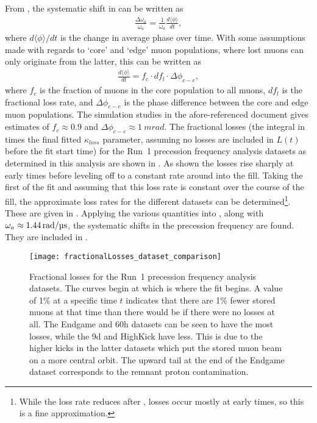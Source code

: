 From , the systematic shift in \wa can be written as
    \begin{align}
        \frac{\Delta\omega_{a}}{\omega_{a}} = \frac{1}{\omega_{a}}\frac{d\langle\phi\rangle}{dt},
    \end{align}
where $d\langle\phi\rangle/dt$ is the change in average phase over time. With some assumptions made with regards to `core' and `edge' muon populations, where lost muons can only originate from the latter, this can be written as~\cite{MikeLosses}
    \begin{align} \label{eq:phaseChangeLostMuons}
        \frac{d\langle\phi\rangle}{dt} = f_{c} \cdot df_{l} \cdot \Delta\phi_{c-e},
    \end{align}
where $f_{c}$ is the fraction of muons in the core population to all muons, $df_{l}$ is the fractional loss rate, and $\Delta\phi_{c-e}$ is the phase difference between the core and edge muon populations. The simulation studies in the afore-referenced document gives estimates of $f_{c} \approx 0.9$ and $\Delta\phi_{c-e} \approx \SI{1}{mrad}$. The fractional losses (the integral in  times the final fitted $\kappa_{loss}$ parameter, assuming no losses are included in $L(t)$ before the fit start time) for the Run~1 precession frequency analysis datasets as determined in this analysis are shown in . As shown the losses rise sharply at early times before leveling off to a constant rate around  into the fill. Taking the first  of the fit and assuming that this loss rate is constant over the course of the fill, the approximate loss rates for the different datasets can be determined\footnote{While the loss rate reduces after , losses occur mostly at early times, so this is a fine approximation.}. These are given in . Applying the various quantities into , along with $\omega_{a} \approx \SI{1.44}{rad}/\SI{}{\micro s}$, the systematic shifts in the precession frequency are found. They are included in .



\begin{figure}
    \centering
    \texttt{[image: fractionalLosses\_dataset\_comparison]}
    \caption[Fractional muon losses in the analyzed Run~1 datasets]{Fractional losses for the Run~1 precession frequency analysis datasets. The curves begin at  which is where the fit begins. A value of 1\% at a specific time $t$ indicates that there are 1\% fewer stored muons at that time than there would be if there were no losses at all. The Endgame and 60h datasets can be seen to have the most losses, while the 9d and HighKick have less. This is due to the higher kicks in the latter datasets which put the stored muon beam on a more central orbit. The upward tail at the end of the Endgame dataset corresponds to the remnant proton contamination.}
    \label{fig:fractionallosses}
\end{figure}



